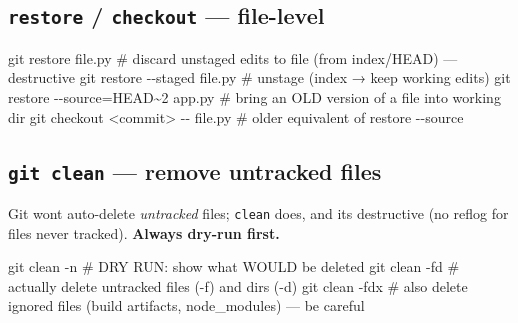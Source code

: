 \documentclass[11pt]{article}
\newenvironment{Shaded}{\begin{snugshade}}{\end{snugshade}}
\newcommand{\AttributeTok}[1]{\textcolor[rgb]{0.16,0.50,0.73}{#1}}
\newcommand{\CommentTok}[1]{\textcolor[rgb]{0.48,0.49,0.49}{#1}}
\newcommand{\FunctionTok}[1]{\textcolor[rgb]{0.56,0.27,0.68}{#1}}
\newcommand{\NormalTok}[1]{\textcolor[rgb]{0.81,0.81,0.76}{#1}}
\newcommand{\OperatorTok}[1]{\textcolor[rgb]{0.81,0.81,0.76}{#1}}
\begin{document}
\subsection{\texorpdfstring{\texttt{restore} / \texttt{checkout} --- file-level}{restore / checkout --- file-level}}\label{restore--checkout--file-level}


\begin{Shaded}
\begin{Highlighting}[]
\FunctionTok{git}\NormalTok{ restore file.py                 }\CommentTok{\# discard unstaged edits to file (from index/HEAD) — destructive}
\FunctionTok{git}\NormalTok{ restore }\AttributeTok{{-}{-}staged}\NormalTok{ file.py        }\CommentTok{\# unstage (index → keep working edits)}
\FunctionTok{git}\NormalTok{ restore }\AttributeTok{{-}{-}source}\OperatorTok{=}\NormalTok{HEAD\textasciitilde{}2 app.py  }\CommentTok{\# bring an OLD version of a file into working dir}
\FunctionTok{git}\NormalTok{ checkout }\OperatorTok{\textless{}}\NormalTok{commit}\OperatorTok{\textgreater{}}\NormalTok{ {-}{-} file.py    }\CommentTok{\# older equivalent of restore {-}{-}source}
\end{Highlighting}
\end{Shaded}

\subsection{\texorpdfstring{\texttt{git\ clean} --- remove untracked files}{git clean --- remove untracked files}}\label{git-clean--remove-untracked-files}

Git won\textquotesingle t auto-delete \emph{untracked} files; \texttt{clean} does, and it\textquotesingle s destructive (no reflog for files never tracked). \textbf{Always dry-run first.}


\begin{Shaded}
\begin{Highlighting}[]
\FunctionTok{git}\NormalTok{ clean }\AttributeTok{{-}n}         \CommentTok{\# DRY RUN: show what WOULD be deleted}
\FunctionTok{git}\NormalTok{ clean }\AttributeTok{{-}fd}        \CommentTok{\# actually delete untracked files ({-}f) and dirs ({-}d)}
\FunctionTok{git}\NormalTok{ clean }\AttributeTok{{-}fdx}       \CommentTok{\# also delete ignored files (build artifacts, node\_modules) — be careful}
\end{Highlighting}
\end{Shaded}
\end{document}
